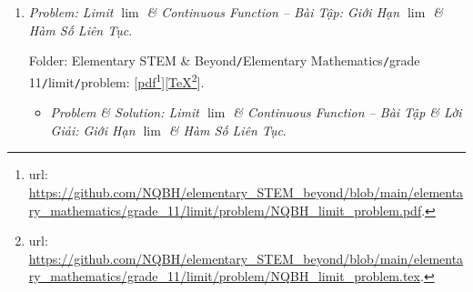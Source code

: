 \documentclass[12pt]{article}
\begin{document}
\begin{enumerate}
	Folder: {\sf Elementary STEM \& Beyond{\tt/}Elementary Mathematics{\tt/}grade 11{\tt/}progression{\tt/}problem}: [\href{https://github.com/NQBH/elementary_STEM_beyond/blob/main/elementary_mathematics/grade_11/progression/problem/NQBH_progression_problem.pdf}{pdf}\footnote{{\sc url}: \url{https://github.com/NQBH/elementary_STEM_beyond/blob/main/elementary_mathematics/grade_11/progression/problem/NQBH_progression_problem.pdf}.}][\href{https://github.com/NQBH/elementary_STEM_beyond/blob/main/elementary_mathematics/grade_11/progression/problem/NQBH_progression_problem.tex}{\TeX}\footnote{{\sc url}: \url{https://github.com/NQBH/elementary_STEM_beyond/blob/main/elementary_mathematics/grade_11/progression/problem/NQBH_progression_problem.tex}.}].
	\begin{itemize}
		\item {\it Problem \& Solution: Arithmetic \& Geometric Progressions -- Bài Tập \& Lời Giải: Cấp Số Cộng \& Cấp Số Nhân}.
		
		Folder: {\sf Elementary STEM \& Beyond{\tt/}Elementary Mathematics{\tt/}grade 11{\tt/}progression{\tt/}solution}: [\href{https://github.com/NQBH/elementary_STEM_beyond/blob/main/elementary_mathematics/grade_11/progression/solution/NQBH_progression_solution.pdf}{pdf}\footnote{{\sc url}: \url{https://github.com/NQBH/elementary_STEM_beyond/blob/main/elementary_mathematics/grade_11/progression/solution/NQBH_progression_solution.pdf}.}][\href{https://github.com/NQBH/elementary_STEM_beyond/blob/main/elementary_mathematics/grade_11/progression/solution/NQBH_progression_solution.tex}{\TeX}\footnote{{\sc url}: \url{https://github.com/NQBH/elementary_STEM_beyond/blob/main/elementary_mathematics/grade_11/progression/solution/NQBH_progression_solution.tex}.}].
	\end{itemize}
	\item {\it Problem: Limit $\lim$ \& Continuous Function -- Bài Tập: Giới Hạn $\lim$ \& Hàm Số Liên Tục}.
	
	Folder: {\sf Elementary STEM \& Beyond{\tt/}Elementary Mathematics{\tt/}grade 11{\tt/}limit{\tt/}problem}: [\href{https://github.com/NQBH/elementary_STEM_beyond/blob/main/elementary_mathematics/grade_11/limit/problem/NQBH_limit_problem.pdf}{pdf}\footnote{{\sc url}: \url{https://github.com/NQBH/elementary_STEM_beyond/blob/main/elementary_mathematics/grade_11/limit/problem/NQBH_limit_problem.pdf}.}][\href{https://github.com/NQBH/elementary_STEM_beyond/blob/main/elementary_mathematics/grade_11/limit/problem/NQBH_limit_problem.tex}{\TeX}\footnote{{\sc url}: \url{https://github.com/NQBH/elementary_STEM_beyond/blob/main/elementary_mathematics/grade_11/limit/problem/NQBH_limit_problem.tex}.}].
	\begin{itemize}
		\item {\it Problem \& Solution: Limit $\lim$ \& Continuous Function -- Bài Tập \& Lời Giải: Giới Hạn $\lim$ \& Hàm Số Liên Tục}.
		

\end{itemize}
\end{enumerate}
\end{document}
